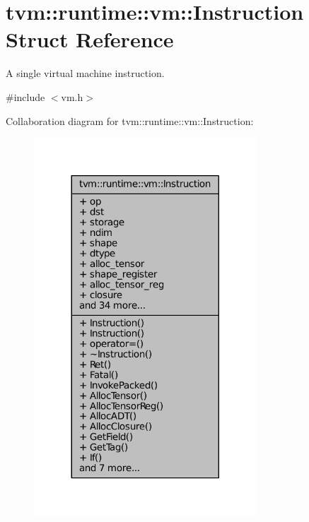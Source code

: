 \hypertarget{structtvm_1_1runtime_1_1vm_1_1Instruction}{}\section{tvm\+:\+:runtime\+:\+:vm\+:\+:Instruction Struct Reference}
\label{structtvm_1_1runtime_1_1vm_1_1Instruction}


A single virtual machine instruction.  




{\ttfamily \#include $<$vm.\+h$>$}



Collaboration diagram for tvm\+:\+:runtime\+:\+:vm\+:\+:Instruction\+:
\nopagebreak
\begin{figure}[H]
\begin{center}
\leavevmode
\includegraphics[width=236pt]{structtvm_1_1runtime_1_1vm_1_1Instruction__coll__graph}
\end{center}
\end{figure}
